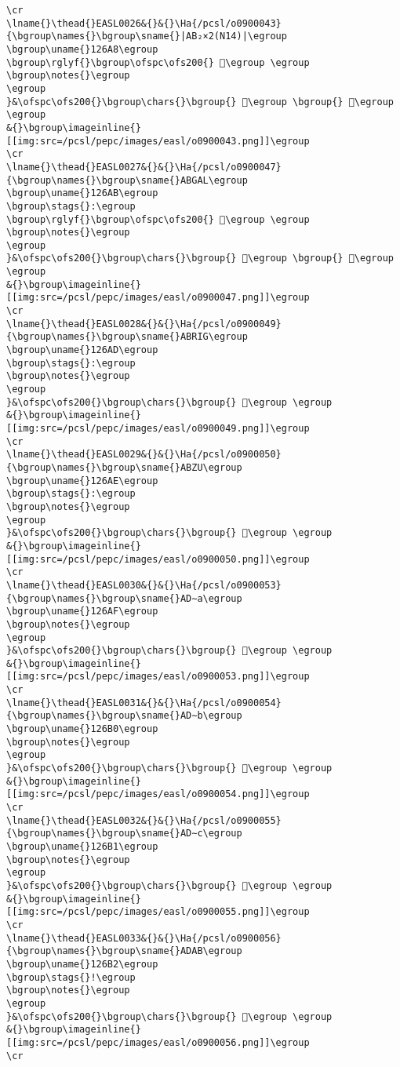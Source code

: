 \begin{verbatim}
\cr
\lname{}\thead{}EASL0026&{}&{}\Ha{/pcsl/o0900043}{\bgroup\names{}\bgroup\sname{}|AB₂×2(N14)|\egroup
\bgroup\uname{}126A8\egroup
\bgroup\rglyf{}\bgroup\ofspc\ofs200{} 𒚨\egroup \egroup
\bgroup\notes{}\egroup
\egroup
}&\ofspc\ofs200{}\bgroup\chars{}\bgroup{} 𒚪\egroup \bgroup{} 𒚨\egroup \egroup
&{}\bgroup\imageinline{}[[img:src=/pcsl/pepc/images/easl/o0900043.png]]\egroup
\cr
\lname{}\thead{}EASL0027&{}&{}\Ha{/pcsl/o0900047}{\bgroup\names{}\bgroup\sname{}ABGAL\egroup
\bgroup\uname{}126AB\egroup
\bgroup\stags{}:\egroup
\bgroup\rglyf{}\bgroup\ofspc\ofs200{} 𒚫\egroup \egroup
\bgroup\notes{}\egroup
\egroup
}&\ofspc\ofs200{}\bgroup\chars{}\bgroup{} 𒚫\egroup \bgroup{} 𒚬\egroup \egroup
&{}\bgroup\imageinline{}[[img:src=/pcsl/pepc/images/easl/o0900047.png]]\egroup
\cr
\lname{}\thead{}EASL0028&{}&{}\Ha{/pcsl/o0900049}{\bgroup\names{}\bgroup\sname{}ABRIG\egroup
\bgroup\uname{}126AD\egroup
\bgroup\stags{}:\egroup
\bgroup\notes{}\egroup
\egroup
}&\ofspc\ofs200{}\bgroup\chars{}\bgroup{} 𒚭\egroup \egroup
&{}\bgroup\imageinline{}[[img:src=/pcsl/pepc/images/easl/o0900049.png]]\egroup
\cr
\lname{}\thead{}EASL0029&{}&{}\Ha{/pcsl/o0900050}{\bgroup\names{}\bgroup\sname{}ABZU\egroup
\bgroup\uname{}126AE\egroup
\bgroup\stags{}:\egroup
\bgroup\notes{}\egroup
\egroup
}&\ofspc\ofs200{}\bgroup\chars{}\bgroup{} 𒚮\egroup \egroup
&{}\bgroup\imageinline{}[[img:src=/pcsl/pepc/images/easl/o0900050.png]]\egroup
\cr
\lname{}\thead{}EASL0030&{}&{}\Ha{/pcsl/o0900053}{\bgroup\names{}\bgroup\sname{}AD∼a\egroup
\bgroup\uname{}126AF\egroup
\bgroup\notes{}\egroup
\egroup
}&\ofspc\ofs200{}\bgroup\chars{}\bgroup{} 𒚯\egroup \egroup
&{}\bgroup\imageinline{}[[img:src=/pcsl/pepc/images/easl/o0900053.png]]\egroup
\cr
\lname{}\thead{}EASL0031&{}&{}\Ha{/pcsl/o0900054}{\bgroup\names{}\bgroup\sname{}AD∼b\egroup
\bgroup\uname{}126B0\egroup
\bgroup\notes{}\egroup
\egroup
}&\ofspc\ofs200{}\bgroup\chars{}\bgroup{} 𒚰\egroup \egroup
&{}\bgroup\imageinline{}[[img:src=/pcsl/pepc/images/easl/o0900054.png]]\egroup
\cr
\lname{}\thead{}EASL0032&{}&{}\Ha{/pcsl/o0900055}{\bgroup\names{}\bgroup\sname{}AD∼c\egroup
\bgroup\uname{}126B1\egroup
\bgroup\notes{}\egroup
\egroup
}&\ofspc\ofs200{}\bgroup\chars{}\bgroup{} 𒚱\egroup \egroup
&{}\bgroup\imageinline{}[[img:src=/pcsl/pepc/images/easl/o0900055.png]]\egroup
\cr
\lname{}\thead{}EASL0033&{}&{}\Ha{/pcsl/o0900056}{\bgroup\names{}\bgroup\sname{}ADAB\egroup
\bgroup\uname{}126B2\egroup
\bgroup\stags{}!\egroup
\bgroup\notes{}\egroup
\egroup
}&\ofspc\ofs200{}\bgroup\chars{}\bgroup{} 𒚲\egroup \egroup
&{}\bgroup\imageinline{}[[img:src=/pcsl/pepc/images/easl/o0900056.png]]\egroup
\cr

\end{verbatim}
